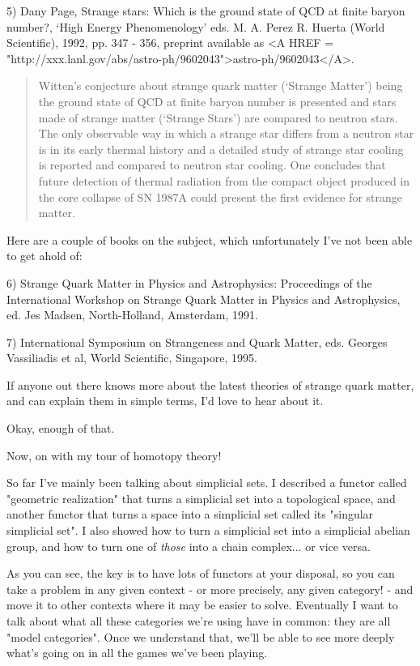 5) Dany Page, Strange stars: Which is the ground state of QCD at finite 
baryon number?, `High Energy Phenomenology' eds. M. A. Perez \text{\&}  R. Huerta 
(World Scientific), 1992, pp. 347 - 356, preprint available as 
<A HREF = "http://xxx.lanl.gov/abs/astro-ph/9602043">astro-ph/9602043</A>.


\begin{quote}
  Witten's conjecture about strange quark matter (`Strange Matter') being 
  the ground state of QCD at finite baryon number is presented and stars 
  made of strange matter (`Strange Stars') are compared to neutron stars. 
  The only observable way in which a strange star differs from a neutron 
  star is in its early thermal history and a detailed study of strange star 
  cooling is reported and compared to neutron star cooling. One concludes 
  that future detection of thermal radiation from the compact object 
  produced in the core collapse of SN 1987A could present the first 
  evidence for strange matter. 

\end{quote}
    
Here are a couple of books on the subject, which unfortunately I've
not been able to get ahold of:

6) Strange Quark Matter in Physics and Astrophysics: Proceedings of the
International Workshop on Strange Quark Matter in Physics and Astrophysics,
ed. Jes Madsen, North-Holland, Amsterdam, 1991.

7) International Symposium on Strangeness and Quark Matter, eds. Georges 
Vassiliadis et al, World Scientific, Singapore, 1995.

If anyone out there knows more about the latest theories of strange quark
matter, and can explain them in simple terms, I'd love to hear about it.

Okay, enough of that.

Now, on with my tour of homotopy theory!

So far I've mainly been talking about simplicial sets.  I described a
functor called "geometric realization" that turns a simplicial set into
a topological space, and another functor that turns a space into a
simplicial set called its "singular simplicial set".  I also showed how
to turn a simplicial set into a simplicial abelian group, and how
to turn one of \emph{those} into a chain complex... or vice versa.

As you can see, the key is to have lots of functors at your disposal,
so you can take a problem in any given context - or more precisely,
any given category! - and move it to other contexts where it may be
easier to solve.  Eventually I want to talk about what all these
categories we're using have in common: they are all "model
categories".  Once we understand that, we'll be able to see more
deeply what's going on in all the games we've been playing.

